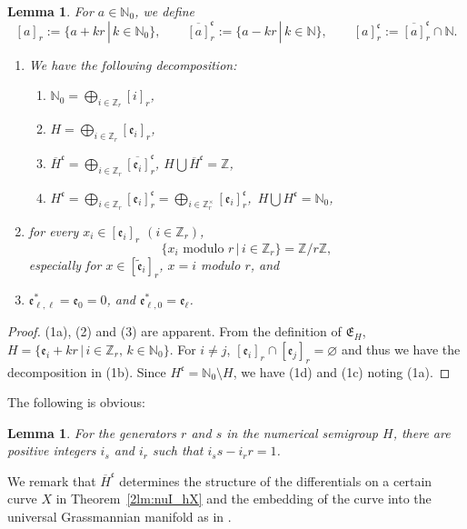 \documentclass[10pt,a4paper]{amsart}
\def\ZZ{{\mathbb Z}}
\def\NN{{\mathbb N}}
\def\fE{{\mathfrak E}}
\def\fc{{\mathfrak c}}
\def\fe{{\mathfrak e}}
\def\tfe{{\widetilde{\mathfrak e}}}
\def\lH{{\overline H}}
\numberwithin{equation}{section}
\newtheorem{Lemma}[Theorem]{Lemma}
\begin{document}
\begin{Lemma}\label{2lm:NSG1}
For $a \in \NN_0$, we define
\[
[a]_r:= \{ a + k r \, | \, k \in \NN_0\}, \qquad
\overline{[a]}_r^\fc:=
\{ a - k r \, | \, k \in \NN\}, \qquad
[a]_r^\fc:=\overline{[a]}_r^\fc\cap \NN.
\]
\begin{enumerate}\itemsep=0pt
\item[$1.$] We have the following decomposition:
\begin{enumerate}\itemsep=0pt
\item[$(a)$]
$ \NN_0 = \bigoplus_{i\in \ZZ_r} [i]_r$,

\item[$(b)$]
$H = \bigoplus_{i\in \ZZ_r} [\fe_i]_r$,

\item[$(c)$]
$\lH^\fc = \bigoplus_{i\in \ZZ_r} \overline{[\fe_i]}_r^\fc$, $H\bigcup \lH^\fc=\ZZ$,


\item[$(d)$]
$H^\fc = \bigoplus_{i\in \ZZ_r} [\fe_i]_r^\fc
= \bigoplus_{i\in \ZZ_r^\times} [\fe_i]_r^\fc$,\ $H\bigcup H^\fc=\NN_0$,
\end{enumerate}

\item[$2.$] for every $x_i \in [\fe_i]_r$ $(i\in \ZZ_r)$,
\[
\{x_i \text{ modulo } r\, |\, i \in \ZZ_r\}=\ZZ/r \ZZ,
\]
especially for $x \in [\tfe_i]_r$, $x = i$ modulo $r$, and

\item[$3.$] $\fe_{\ell,\ell}^*=\fe_0=0$, and $\fe_{\ell,0}^* =\fe_{\ell}$.
\end{enumerate}
\end{Lemma}

\begin{proof}
(1a), (2) and (3) are apparent.
From the definition of $\fE_H$, $H= \{ \fe_i + k r \, |\, i \in \ZZ_r,\, k \in \NN_0\}$.
For $i \neq j$, $[\fe_i]_r\cap [\fe_j]_r = \varnothing$ and thus we have the decomposition in (1b).
Since $H^\fc = \NN_0 \setminus H$, we have (1d) and (1c) noting (1a).
\end{proof}

The following is obvious:

\begin{Lemma}\label{2lm:rs_iris}
For the generators $r$ and $s$ in the numerical semigroup $H$, there are positive integers $i_s$ and $i_r$ such that
$ i_s s- i_r r = 1$.
\end{Lemma}

We remark that $\lH^\fc$ determines the structure of the differentials on a certain curve $X$ in Theorem~\ref{2lm:nuI_hX} and the embedding of the curve into the universal Grassmannian manifold as in \cite[p.~46]{SegalWilson}.
\end{document}
